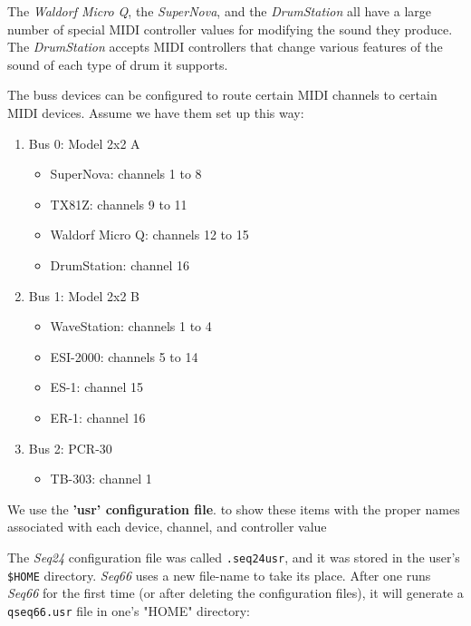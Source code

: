    The \textsl{Waldorf Micro Q},
   the \textsl{SuperNova},
   and the \textsl{DrumStation} all have a large
   number of special MIDI controller values for modifying the sound they
   produce.
   The \textsl{DrumStation} accepts MIDI controllers that change various
   features of the sound of each type of drum it supports.

   The buss devices can be configured to route certain
   MIDI channels to certain MIDI devices.  Assume we have them
   set up this way:

   \begin{enumerate}
      \item Bus 0: Model 2x2 A
      \begin{itemize}
         \item SuperNova: channels 1 to 8
         \item TX81Z: channels 9 to 11
         \item Waldorf Micro Q: channels 12 to 15
         \item DrumStation: channel 16
      \end{itemize}
      \item Bus 1: Model 2x2 B
      \begin{itemize}
         \item WaveStation: channels 1 to 4
         \item ESI-2000: channels 5 to 14
         \item ES-1: channel 15
         \item ER-1: channel 16
      \end{itemize}
      \item Bus 2: PCR-30
      \begin{itemize}
         \item TB-303: channel 1
      \end{itemize}
   \end{enumerate}

   We use the \textbf{'usr' configuration file}.
   to show these items with the proper
   names associated with each device, channel, and controller value

   The \textsl{Seq24} configuration file was called
   \texttt{.seq24usr}, and it was stored in the user's \texttt{\$HOME}
   directory.
   \textsl{Seq66} uses a new file-name
   to take its place.
   After one runs \textsl{Seq66} for the first time (or after deleting
   the configuration files), it will generate a
   \texttt{qseq66.usr} file in one's "HOME" directory:

